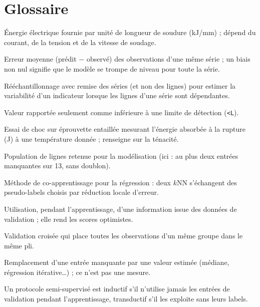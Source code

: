 \section{Glossaire}
\label{annexe:glossaire}

\begin{description}[leftmargin=0pt,itemsep=0.35em,font=\bfseries\color{csbordeaux}]
  \item[Apport thermique] Énergie électrique fournie par unité de longueur de soudure (kJ/mm) ; dépend du courant, de la tension et de la vitesse de soudage.
  \item[Biais d'une série] Erreur moyenne (prédit $-$ observé) des observations d'une même série ; un biais non nul signifie que le modèle se trompe de niveau pour toute la série.
  \item[Bootstrap par groupes] Rééchantillonnage avec remise des séries (et non des lignes) pour estimer la variabilité d'un indicateur lorsque les lignes d'une série sont dépendantes.
  \item[Censure] Valeur rapportée seulement comme inférieure à une limite de détection (\texttt{<L}).
  \item[Charpy (essai)] Essai de choc sur éprouvette entaillée mesurant l'énergie absorbée à la rupture (J) à une température donnée ; renseigne sur la ténacité.
  \item[Cohorte] Population de lignes retenue pour la modélisation (ici : au plus deux entrées manquantes sur 13, sans doublon).
  \item[COREG] Méthode de co-apprentissage pour la régression : deux $k$NN s'échangent des pseudo-labels choisis par réduction locale d'erreur.
  \item[Fuite d'information] Utilisation, pendant l'apprentissage, d'une information issue des données de validation ; elle rend les scores optimistes.
  \item[GroupKFold] Validation croisée qui place toutes les observations d'un même groupe dans le même pli.
  \item[Imputation] Remplacement d'une entrée manquante par une valeur estimée (médiane, régression itérative\ldots) ; ce n'est pas une mesure.
  \item[Inductif / transductif] Un protocole semi-supervisé est inductif s'il n'utilise jamais les entrées de validation pendant l'apprentissage, transductif s'il les exploite sans leurs labels.

\end{description}
